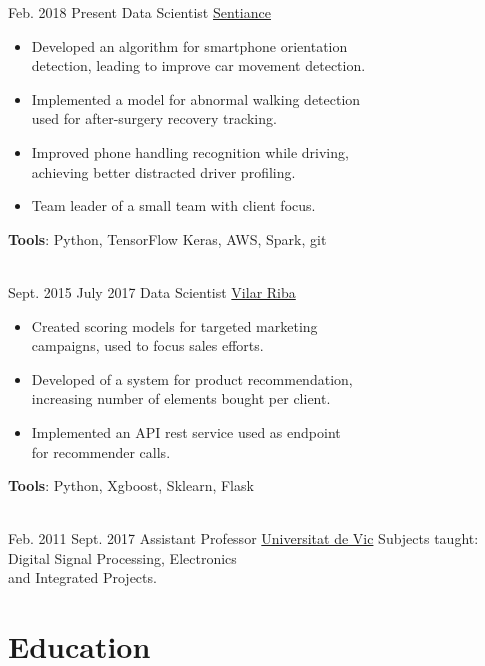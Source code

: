 \documentclass[letterpaper]{DS_class_file} %
\begin{document}
\begin{twenty}
	\twentyitem
	{Feb. 2018}
	{Present}
	{Data Scientist}
	{\href{https://www.sentiance.com/}{Sentiance}}
	{}
	{\begin{itemize}
			\item Developed an algorithm for smartphone orientation\\detection, leading to improve car movement detection.
			\item Implemented a model for abnormal walking detection\\used for after-surgery recovery tracking.
			\item Improved phone handling recognition while driving,\\achieving better distracted driver profiling.
			\item Team leader of a small team with client focus.
	\end{itemize}
	\textbf{Tools}: Python, TensorFlow Keras, AWS, Spark, git}

	\\
	\twentyitem
	{Sept. 2015}
	{July 2017}
	{Data Scientist}
	{\href{http://www.vilarriba.com/}{Vilar Riba}}
	{}
	{\begin{itemize}
			\item Created scoring models for targeted marketing  \\ campaigns, used to focus sales efforts.
			\item Developed of a system for product recommendation, \\ increasing number of elements bought per client.
			\item Implemented an API rest service used as endpoint \\ for recommender calls.
	\end{itemize}
	\textbf{Tools}: Python, Xgboost, Sklearn, Flask }
	\\
	\twentyitem
	{Feb. 2011}
	{Sept. 2017}
	{Assistant Professor}
	{\href{https://www.uvic.cat/}{Universitat de Vic}}
	{Subjects taught: Digital Signal Processing, Electronics \\ and Integrated Projects.}
	{}
\end{twenty}
\vspace{-4mm}
\section{Education}
\end{document}

